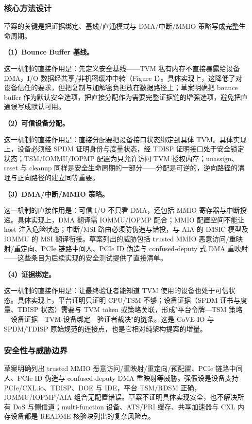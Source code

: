 \documentclass[11pt]{ctexart}
\begin{document}
\subsubsection{核心方法设计}
草案的关键是把证据绑定、基线/直通模式与 DMA/中断/MMIO 策略写成完整生命周期。\par
\noindent\textbf{（1）Bounce Buffer 基线。}\par
这一机制的直接作用是：先定义安全基线——TVM 私有内存不直接暴露给设备 DMA，I/O 数据经共享/非机密缓冲中转（Figure 1）。具体实现上，这降低了对设备信任的要求，但把复制与加解密负担放在数据路径上；草案明确把 bounce buffer 作为默认安全选项，把直接分配作为需要完整证据链的增强选项，避免把直通误写成默认可用。\par
\noindent\textbf{（2）可信设备分配。}\par
这一机制的直接作用是：直接分配要把设备接口状态绑定到具体 TVM。具体实现上，设备必须经 SPDM 证明身份与度量状态，经 TDISP 证明接口处于安全锁定状态；TSM/IOMMU/IOPMP 配置为只允许访问 TVM 授权内存；unassign、reset 与 cleanup 同样是安全生命周期的一部分——分配是可逆的，逆向路径的清理与正向路径的建立同等重要。\par
\noindent\textbf{（3）DMA/中断/MMIO 策略。}\par
这一机制的直接作用是：可信 I/O 不只看 DMA，还包括 MMIO 寄存器与中断投递。具体实现上，DMA 翻译需 IOMMU/IOPMP 配合；MMIO 配置空间不能让 host 注入危险状态；中断/MSI 路由必须防伪造与错投，与 AIA 的 IMSIC 模型及 IOMMU 的 MSI 翻译衔接。草案列出的威胁包括 trusted MMIO 恶意访问/重映射/重定向、PCIe 链路中间人、PCIe ID 伪造与 confused-deputy 式 DMA 重映射——这些条目为后续实现的安全测试提供了直接清单。\par
\noindent\textbf{（4）证据绑定。}\par
这一机制的直接作用是：让最终验证者能知道 TVM 使用的设备也处于可信状态。具体实现上，平台证明只证明 CPU/TSM 不够；设备证据（SPDM 证书与度量、TDISP 状态）需要与 TVM token 或策略关联，形成"平台令牌—TSM 策略—设备证据—TVM-设备绑定—验证者裁决"的链条。这是 CoVE-IO 与 SPDM/TDISP 原始规范的连接点，也是它相对纯架构提案的增量。\par
\subsubsection{安全性与威胁边界}
草案明确列出 trusted MMIO 恶意访问/重映射/重定向/预配置、PCIe 链路中间人、PCIe ID 伪造与 confused-deputy DMA 重映射等威胁。强假设是设备支持 PCIe/CXL.io、TDISP、DOE 与 IDE，平台 TSM/RDSM 正确，IOMMU/IOPMP/AIA 组合无配置错误。草案不证明具体实现安全，也不解决所有 DoS 与侧信道；multi-function 设备、ATS/PRI 缓存、共享加速器与 CXL 内存设备都是 README 核验块列出的复杂风险点。\par
\end{document}
